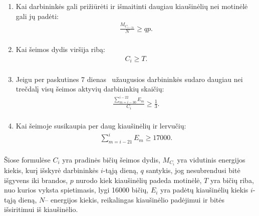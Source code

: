 \documentclass{VUMIFKompMagistrinis}
\begin{document}
\begin{enumerate}
\item Kai darbinink\.es gali pri\v{z}i\=ur\.eti ir i\v{s}maitinti daugiau kiau\v{s}in\.eli\k{u} nei motin\.el\.e gali j\k{u} pad\.eti:
\begin{equation}
\label{ebpss1}
\begin{matrix}\frac{M_{C_{i-21}}} N{\geq}\mathit{qp.}\\\end{matrix}
\end{equation}

\item Kai \v{s}eimos dydis vir\v{s}ija rib\k{a}:
\begin{equation}\label{ebpss2}
\begin{matrix}C_i{\geq}\mathit{T.}\\\end{matrix}
\end{equation}

\item Jeigu per paskutines 7 dienas \ u\v{z}augusios darbinink\.es sudaro daugiau nei tre\v{c}dal\k{i} visų \v{s}eimos aktyvi\k{u} darbininki\k{u} skai\v{c}i\k{u}:
\begin{equation}\label{ebpss3}
\begin{matrix}\frac{\sum _{m=i-30}^{i-22}E_m}{C_i}{\geq}\frac 1 3.\\\end{matrix}
\end{equation}

\item Kai \v{s}eimoje susikaupia per daug kiau\v{s}in\.eli\k{u} ir lervučių:
\begin{equation}\label{ebpss4}
\begin{matrix}\sum _{m=i-21}^iE_m{\geq}17000.\\\end{matrix}
\end{equation}
\end{enumerate}


Šiose formulėse $C_{i}$ yra pradinės bičių šeimos dydis, $M_{C_{i}}$ yra vidutinis energijos kiekis, kurį išskyrė darbininkės $i$-tąją dieną,  $q$ santykis, jog nesubrendusi bitė išgyvens iki brandos, $p$ nurodo kiek kiaušinėlių padeda motinėlė, $T$ yra bičių riba, nuo kurios vyksta spietimasis, lygi 16000 bičių, $E_{i}$ yra padėtų kiaušinėlių kiekis $i$-tąją dieną, $N$-- energijos kiekis, reikalingas kiaušinėlio padėjimui ir bitės išsiritimui iš kiaušinėlio. 
\end{document}

